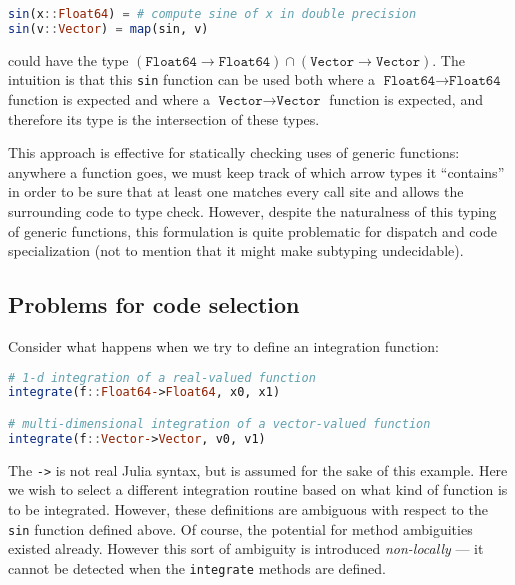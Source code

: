\begin{singlespace}
\begin{lstlisting}[language=julia]
sin(x::Float64) = # compute sine of x in double precision
sin(v::Vector) = map(sin, v)
\end{lstlisting}
\end{singlespace}

\noindent
could have the type $(\texttt{Float64}\rightarrow\texttt{Float64})\cap(\texttt{Vector}\rightarrow\texttt{Vector})$.
The intuition is that this \texttt{sin} function can be
used both where a $\texttt{Float64}\rightarrow\texttt{Float64}$ function
is expected and where a $\texttt{Vector}\rightarrow\texttt{Vector}$ function is expected,
and therefore its type is the intersection of these types.

This approach is effective for statically checking uses of generic
functions: anywhere a function goes, we must keep track of which arrow
types it ``contains'' in order to be sure that at least one matches
every call site and allows the surrounding code to type check.
However, despite the naturalness of this typing of generic functions,
this formulation is quite problematic for dispatch and code specialization
(not to mention that it might make subtyping undecidable).

\subsection{Problems for code selection}

Consider what happens when we try to define an integration function:

\begin{singlespace}
\begin{lstlisting}[language=julia]
# 1-d integration of a real-valued function
integrate(f::Float64->Float64, x0, x1)

# multi-dimensional integration of a vector-valued function
integrate(f::Vector->Vector, v0, v1)
\end{lstlisting}
\end{singlespace}

\noindent
The \texttt{->} is not real Julia syntax, but is assumed for the sake of
this example.
Here we wish to select a different integration routine based on what
kind of function is to be integrated.
However, these definitions are ambiguous with respect to the \texttt{sin}
function defined above.
Of course, the potential for method ambiguities existed already.
However this sort of ambiguity is introduced \emph{non-locally} ---
it cannot be detected when the \texttt{integrate} methods are defined.


